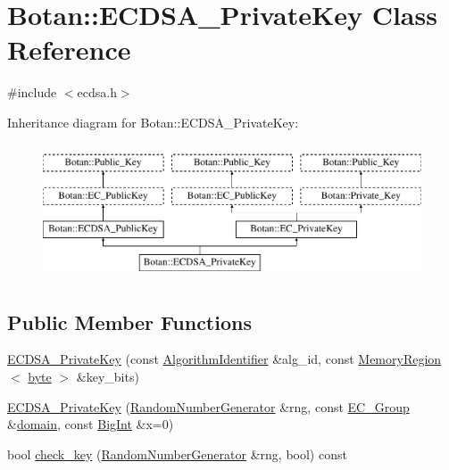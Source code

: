 \hypertarget{classBotan_1_1ECDSA__PrivateKey}{\section{Botan\-:\-:E\-C\-D\-S\-A\-\_\-\-Private\-Key Class Reference}
\label{classBotan_1_1ECDSA__PrivateKey}
}


{\ttfamily \#include $<$ecdsa.\-h$>$}

Inheritance diagram for Botan\-:\-:E\-C\-D\-S\-A\-\_\-\-Private\-Key\-:\begin{figure}[H]
\begin{center}
\leavevmode
\includegraphics[height=4.000000cm]{classBotan_1_1ECDSA__PrivateKey}
\end{center}
\end{figure}
\subsection*{Public Member Functions}
\begin{DoxyCompactItemize}
\item 
\hyperlink{classBotan_1_1ECDSA__PrivateKey_a52cae9ffd29e629271892f97cd952045}{E\-C\-D\-S\-A\-\_\-\-Private\-Key} (const \hyperlink{classBotan_1_1AlgorithmIdentifier}{Algorithm\-Identifier} \&alg\-\_\-id, const \hyperlink{classBotan_1_1MemoryRegion}{Memory\-Region}$<$ \hyperlink{namespaceBotan_a7d793989d801281df48c6b19616b8b84}{byte} $>$ \&key\-\_\-bits)
\item 
\hyperlink{classBotan_1_1ECDSA__PrivateKey_ae8ac273569523f8faeb8284095da2b6c}{E\-C\-D\-S\-A\-\_\-\-Private\-Key} (\hyperlink{classBotan_1_1RandomNumberGenerator}{Random\-Number\-Generator} \&rng, const \hyperlink{classBotan_1_1EC__Group}{E\-C\-\_\-\-Group} \&\hyperlink{classBotan_1_1EC__PublicKey_a5fe61411ec55d30d9cf0c36116223a71}{domain}, const \hyperlink{classBotan_1_1BigInt}{Big\-Int} \&x=0)
\item 
bool \hyperlink{classBotan_1_1ECDSA__PrivateKey_ac11d29ddaebc752a3857019de77b8af9}{check\-\_\-key} (\hyperlink{classBotan_1_1RandomNumberGenerator}{Random\-Number\-Generator} \&rng, bool) const 
\end{DoxyCompactItemize}
